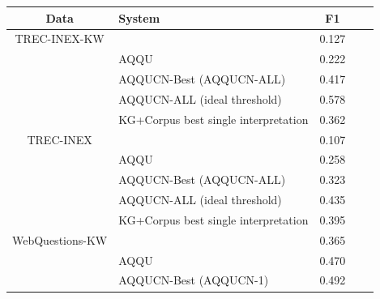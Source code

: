 \documentclass{svjour3}
\begin{document}
\begin{table}[th]
\centering
\begin{tabular}{| c | l | c |c|c|}
\hline
Data  & System  & F1 \\ %
\hline
TREC-INEX-KW
& \citet{BerantL2015AgendaIL} & 0.127 \\%
& AQQU \citep{BastH2015aqqu} & 0.222 \\ %
& AQQUCN-Best (AQQUCN-ALL) & \cellcolor{green!30}0.417 \\
& AQQUCN-ALL (ideal threshold) & \cellcolor{blue!10} 0.578 \\ 
& KG+Corpus best single interpretation & \cellcolor{blue!10} 0.362\\
\hline
\hline
TREC-INEX
& \citet{BerantL2015AgendaIL} & 0.107  \\
& AQQU \citep{BastH2015aqqu} & 0.258 \\ %
& AQQUCN-Best (AQQUCN-ALL) & \cellcolor{green!30} 0.323 \\
& AQQUCN-ALL (ideal threshold) & \cellcolor{blue!10} 0.435 \\ %
& KG+Corpus best single interpretation & \cellcolor{blue!10} 0.395 \\
\hline
\hline
WebQuestions-KW
& \citet{BerantL2015AgendaIL} & 0.365\\%
& AQQU \citep{BastH2015aqqu}  & 0.470 \\%
& AQQUCN-Best (AQQUCN-1) & \cellcolor{green!30} 0.492 \\

\end{tabular}
\end{table}
\end{document}

